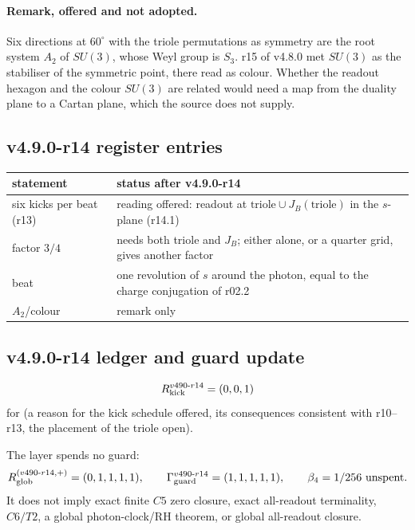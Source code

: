 \paragraph{Remark, offered and not adopted.}
Six directions at \(60^\circ\) with the triole permutations as symmetry are the root system \(A_2\) of \(SU(3)\), whose Weyl
group is \(S_3\).  r15 of v4.8.0 met \(SU(3)\) as the stabiliser of the symmetric point, there read as colour.  Whether the
readout hexagon and the colour \(SU(3)\) are related would need a map from the duality plane to a Cartan plane, which the
source does not supply.

\subsection*{v4.9.0-r14 register entries}
\label{subsec:v490-r14-register}

\begin{center}
\small
\begin{tabular}{@{}>{\raggedright\arraybackslash}p{}>{\raggedright\arraybackslash}p{}@{}}
\toprule
statement & status after v4.9.0-r14\\
\midrule
six kicks per beat (r13) & reading offered: readout at \(\text{triole}\cup J_B(\text{triole})\) in the \(s\)-plane (r14.1)\\
factor \(3/4\) & needs both triole and \(J_B\); either alone, or a quarter grid, gives another factor\\
beat & one revolution of \(s\) around the photon, equal to the charge conjugation of r02.2\\
\(A_2\)/colour & remark only\\
\bottomrule
\end{tabular}
\end{center}

\subsection*{v4.9.0-r14 ledger and guard update}
\label{subsec:v490-r14-ledger-guard}

\[
R_{\rm kick}^{v490\text{-}r14}=(0,0,1)
\]
for (a reason for the kick schedule offered, its consequences consistent with r10--r13, the placement of the triole open).

The layer spends no guard:
\[
R_{\rm glob}^{(v490\text{-}r14,+)}=(0,1,1,1,1),
\qquad
\Gamma_{\rm guard}^{v490\text{-}r14}=(1,1,1,1,1),
\qquad
\beta_4=1/256\ \text{unspent}.
\]
It does not imply exact finite \(C5\) zero closure, exact all-readout terminality,
\(C6/T2\), a global photon-clock/RH theorem, or global all-readout closure.

